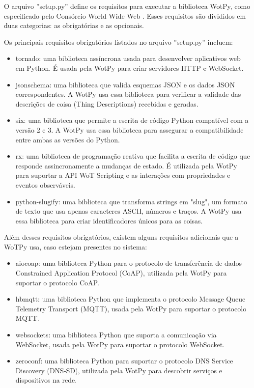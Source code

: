 O arquivo ''setup.py''  define os requisitos para executar a biblioteca WotPy, como especificado pelo Consórcio World Wide Web \cite{Architecture}. Esses requisitos são divididos em duas categorias: as obrigatórias e as opcionais.

Os principais requisitos obrigatórios listados no arquivo ''setup.py'' incluem:

\begin{itemize}
\item tornado: uma biblioteca assíncrona usada para desenvolver aplicativos web em Python. É usada pela WotPy para criar servidores HTTP e WebSocket.
\item jsonschema: uma biblioteca que valida esquemas JSON e os dados JSON correspondentes. A WotPy usa essa biblioteca para verificar a validade das descrições de coisa (Thing Descriptions) recebidas e geradas.
\item six: uma biblioteca que permite a escrita de código Python compatível com a versão 2 e 3. A WotPy usa essa biblioteca para assegurar a compatibilidade entre ambas as versões do Python.
\item rx: uma biblioteca de programação reativa que facilita a escrita de código que responde assincronamente a mudanças de estado. É utilizada pela WotPy para suportar a API WoT Scripting e as interações com propriedades e eventos observáveis.
\item python-slugify: uma biblioteca que transforma strings em "slug", um formato de texto que usa apenas caracteres ASCII, números e traços. A WotPy usa essa biblioteca para criar identificadores únicos para as coisas.
\end{itemize}

Além desses requisitos obrigatórios, existem alguns requisitos adicionais que a WoTPy usa, caso estejam presentes no sistema:

\begin{itemize}
\item aiocoap: uma biblioteca Python para o protocolo de transferência de dados Constrained Application Protocol (CoAP), utilizada pela WotPy para suportar o protocolo CoAP.
\item hbmqtt: uma biblioteca Python que implementa o protocolo Message Queue Telemetry Transport (MQTT), usada pela WotPy para suportar o protocolo MQTT.
\item websockets: uma biblioteca Python que suporta a comunicação via WebSocket, usada pela WotPy para suportar o protocolo WebSocket.
\item zeroconf: uma biblioteca Python para suportar o protocolo DNS Service Discovery (DNS-SD), utilizada pela WotPy para descobrir serviços e dispositivos na rede.
\end{itemize}

